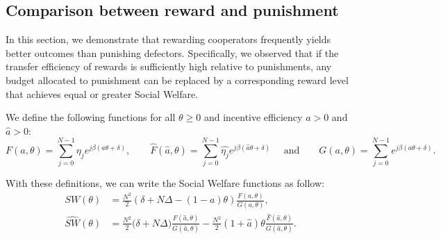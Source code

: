 \documentclass{article}
\begin{document}
\subsection{Comparison between reward and punishment}
In this section, we demonstrate that rewarding cooperators frequently yields better outcomes than punishing defectors. Specifically, we observed that if the transfer efficiency of rewards is sufficiently high relative to punishments, any budget allocated to punishment can be replaced by a corresponding reward level that achieves equal or greater Social Welfare. 


We define the following functions for all $\theta \ge 0$ and incentive efficiency $a >0$ and $\hat{a} > 0$: 
\begin{equation}
\label{eq: F and hatF}
F(a,\theta) = \sum_{j=0}^{N-1} \eta_je^{j\beta(a\theta+\delta)}, \qquad \hat{F}(\hat{a},\theta) = \sum_{j=0}^{N-1} \hat{\eta_j}e^{j\beta(\hat{a}\theta+\delta)}\quad \text{ and} \qquad G(a,\theta) = \sum_{j=0}^{N-1} e^{j\beta(a\theta+\delta)}.
\end{equation}

With these definitions, we can write the Social Welfare functions as follow:
\begin{subequations}
\begin{align}
SW(\theta) &= \frac{N^2}{2}\left(\delta+N\Delta - (1-a)\theta \right) \frac{F(a, \theta)}{G(a, \theta)},\label{sw1} \\
\widehat{SW}(\theta) &= \frac{N^2}{2} \big(\delta + N\Delta) \frac{F(\hat{a}, \theta)}{G(\hat{a}, \theta)} - \frac{N^2}{2}(1+\hat{a})\theta \frac{\hat{F}(\hat{a}, \theta)}{G(\hat{a}, \theta)}.\label{swb1}
\end{align}    
\end{subequations}
\end{document}
